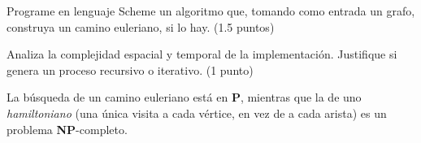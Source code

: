 \prop%
{Programe en lenguaje Scheme un algoritmo que, tomando como entrada un grafo,
construya un camino euleriano, si lo hay. (1.5 puntos)}

\prop%
{Analiza la complejidad espacial y temporal de la  implementación. Justifique si genera un proceso recursivo o iterativo. (1 punto)}



\begin{resalte}
La búsqueda de un camino euleriano está en {\bf P}, mientras
que la de uno \emph{hamiltoniano} (una única visita a cada
vértice, en vez de a cada arista) es un problema {\bf
NP}-completo.
\end{resalte}





